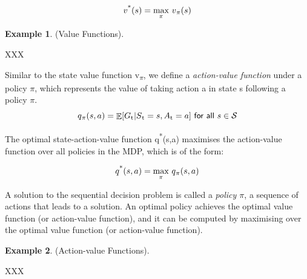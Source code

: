 \documentclass[12pt,twoside]{report}
\theoremstyle{plain}
\theoremstyle{definition}
\DeclareMathOperator{\E}{\mathbb{E}}
\newtheorem{examp}{Example}[section]
\begin{document}
\begin{equation}
v\textsuperscript{*}(s) = \underset{\pi}{\max} \ v\textsubscript{$\pi$}(s)
\end{equation}

\begin{examp} \normalfont (Value Functions).

XXX
\end{examp}

Similar to the state value function v\textsubscript{$\pi$},  we define a \textit{action-value function} under a policy $\pi$, which represents the value of taking action a in state s following a policy $\pi$. 
\begin{equation}
q\textsubscript{$\pi$}(s, a) = \displaystyle \E [G\textsubscript{t} \vert S\textsubscript{t} = s, A\textsubscript{t} = a] \ \textsf{for all}\ s \in \mathcal{S}
\end{equation}

The optimal state-action-value function q\textsuperscript{*}(s,a) maximises the action-value function over all policies in the MDP, which is of the form:

\begin{equation}
q\textsuperscript{*}(s, a) = \underset{\pi}{\max} \ q\textsubscript{$\pi$}(s, a)
\end{equation}

A solution to the sequential decision problem is called a \textit{policy $\pi$}, a sequence of actions that leads to a solution. An optimal policy achieves the optimal value function (or action-value function), and it can be computed by maximising over the optimal value function (or action-value function).

\begin{examp} \normalfont (Action-value Functions).

XXX
\end{examp}



\end{document}
